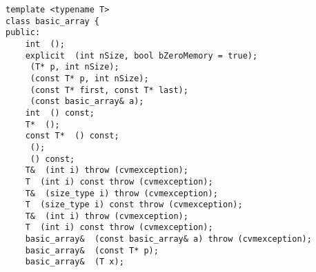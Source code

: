 \noindent%
\verb"template <typename T>"\\
\verb"class basic_array {"\\
\verb"public:"\\
\verb"    int "\verb" ();"\\
\verb"    explicit "\verb" (int nSize, bool bZeroMemory = true);"\\
\verb"    "\verb" (T* p, int nSize);"\\
\verb"    "\verb" (const T* p, int nSize);"\\
\verb"    "\verb" (const T* first, const T* last);"\\
\verb"    "\verb" (const basic_array& a);"\\
\verb"    int "\verb" () const;"\\
\verb"    T* "\verb" ();"\\
\verb"    const T* "\verb" () const;"\\
\verb"    "\verb" ();"\\
\verb"    "\verb" () const;"\\
\verb"    T& "\verb" (int i) throw (cvmexception);"\\
\verb"    T "\verb" (int i) const throw (cvmexception);"\\
\verb"    T& "\verb" (size_type i) throw (cvmexception);"\\
\verb"    T "\verb" (size_type i) const throw (cvmexception);"\\
\verb"    T& "\verb" (int i) throw (cvmexception);"\\
\verb"    T "\verb" (int i) const throw (cvmexception);"\\
\verb"    basic_array& "\verb" (const basic_array& a) throw (cvmexception);"\\
\verb"    basic_array& "\verb" (const T* p);"\\
\verb"    basic_array& "\verb" (T x);"\\
